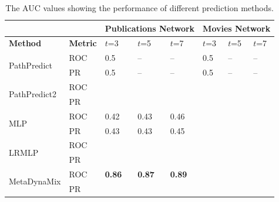 


\begin{table}[t]
\centering
\caption{The AUC values showing the performance of different prediction methods.}
\label{table_publications}\label{tbl:auc}
\begin{tabular}{ll|p{1cm}|p{1cm}|p{1cm}|p{1cm}|p{1cm}|p{1cm}|}
\cline{3-8}
                        &   & \multicolumn{3}{l|}{Publications Network} & \multicolumn{3}{l|}{Movies Network} \\ \hline
\multicolumn{1}{|l|}{\textbf{Method}} & \textbf{Metric} & $t$=3 & $t$=5  & $t$=7  & $t$=3  & $t$=5  & $t$=7     \\ \hline

\multicolumn{1}{|l|}{\multirow{2}{*}{PathPredict}}  & ROC  & 0.5 & -- & -- & 0.5 & -- & -- \\ \cline{2-8}
\multicolumn{1}{|l|}{}  & PR  & 0.5 & -- & -- & 0.5 & -- & -- \\ \hline

\multicolumn{1}{|l|}{\multirow{2}{*}{PathPredict2}}  & ROC  &           &           &           &         &         &         \\ \cline{2-8}
\multicolumn{1}{|l|}{}  & PR  &           &           &           &         &         &         \\ \hline

\multicolumn{1}{|l|}{\multirow{2}{*}{MLP}}  & ROC  &   0.42  &   0.43   &   0.46     &         &         &         \\ \cline{2-8}
\multicolumn{1}{|l|}{}  & PR  &    0.43  &   0.43   &   0.45    &         &         &         \\ \hline

\multicolumn{1}{|l|}{\multirow{2}{*}{LRMLP}}  & ROC  &           &           &           &         &         &         \\ \cline{2-8}
\multicolumn{1}{|l|}{}  & PR  &           &           &           &         &         &         \\ \hline

\multicolumn{1}{|l|}{\multirow{2}{*}{MetaDynaMix}}  & ROC  & \textbf{0.86} &  \textbf{0.87}  & \textbf{0.89}   &    &   &    \\ \cline{2-8}
\multicolumn{1}{|l|}{}  & PR  &    &    &    &    &    &    \\ \hline

\end{tabular}
\end{table}

